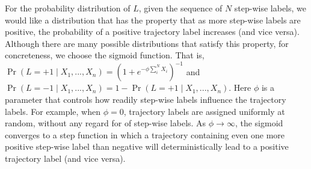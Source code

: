 For the probability distribution of $L$, given the sequence of $N$
step-wise labels, we would like a distribution that has the property
that as more step-wise labels are positive, the probability of a
positive trajectory label increases (and vice versa). Although there
are many possible distributions that satisfy this property, for
concreteness, we choose the sigmoid function. That is,
%
$\Pr(L = +1 \mid X_1, ..., X_n) = (1 + e^{-\phi \sum_i^N X_i})^{-1}$ and
$\Pr(L = -1 \mid X_1, ... ,X_n) = 1 - \Pr(L = +1 \mid X_1, ..., X_n)$.
%
Here $\phi$ is a parameter that controls how readily step-wise labels
influence the trajectory labels.  For example, when $\phi = 0$,
trajectory labels are assigned uniformly at random, without any regard
for of step-wise labels.  As $\phi \rightarrow \infty$, the sigmoid
converges to a step function in which a trajectory containing even one
more positive step-wise label than negative will deterministically
lead to a positive trajectory label (and vice versa).

